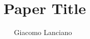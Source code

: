 \documentclass[a4paper,10pt,twocolumn]{article}
\title{
    Paper Title
}
\author{Giacomo Lanciano~\orcidlink{0000-0002-7431-8041}}
\begin{document}
\maketitle

\begin{abstract}
    
\end{abstract}










\end{document}
